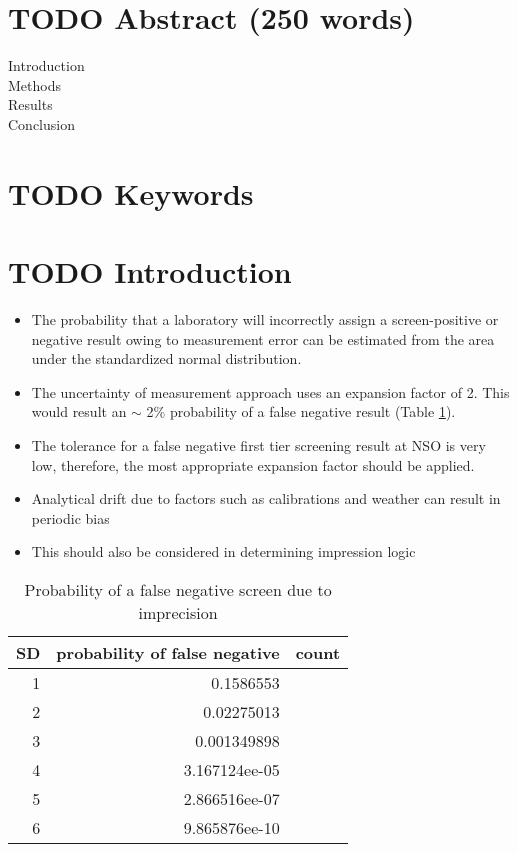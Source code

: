 \documentclass[review]{elsarticle}
\begin{document}
\section*{{\bfseries\sffamily TODO} Abstract (250 words)}
\label{sec:org5d769c1}
\begin{description}
\item[{Introduction}] 

\item[{Methods}] 

\item[{Results}] 

\item[{Conclusion}] 
\end{description}
\section*{{\bfseries\sffamily TODO} Keywords}
\label{sec:org5bd1fea}
\section*{{\bfseries\sffamily TODO} Introduction}
\label{sec:orgd002189}
\begin{itemize}
\item The probability that a laboratory will incorrectly assign a
screen-positive or negative result owing to measurement error can be
estimated from the area under the standardized normal distribution.

\item The uncertainty of measurement approach uses an expansion factor
of 2. This would result an \(\sim\) 2\% probability of a false negative
result (Table \ref{tab:org3724d1a}).
\item The tolerance for a false negative first tier screening result at
NSO is very low, therefore, the most appropriate expansion factor
should be applied.

\item Analytical drift due to factors such as calibrations and weather can
result in periodic bias
\item This should also be considered in determining impression logic
\end{itemize}

\begin{table}[htbp]
\caption[sigma]{\label{tab:org3724d1a}Probability of a false negative screen due to imprecision}
\centering
\begin{tabular}{rrl}
SD & probability of false negative & count\\
\hline
1 & 0.1586553\\
2 & 0.02275013\\
3 & 0.001349898\\
4 & 3.167124ee-05\\
5 & 2.866516ee-07\\
6 & 9.865876ee-10\\
\end{tabular}
\end{table}
\end{document}
